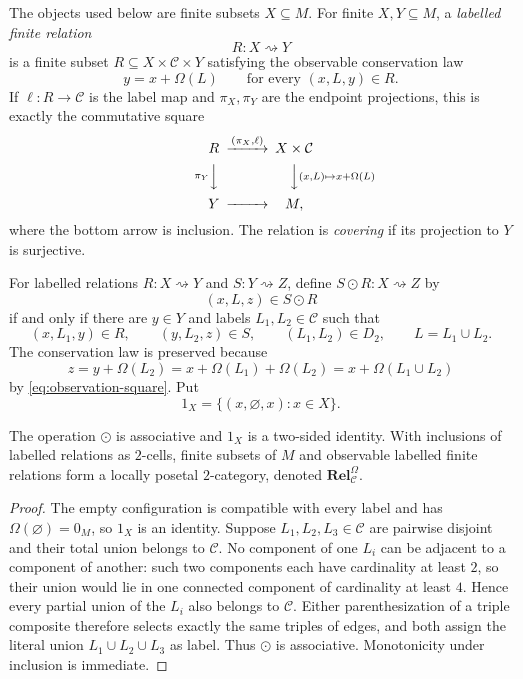 The objects used below are finite subsets $X\subseteq M$.  For finite $X,Y\subseteq M$, a \emph{labelled finite relation}
\[
R:X\rightsquigarrow Y
\]
is a finite subset $R\subseteq X\times\mathcal C\times Y$ satisfying the observable conservation law
\begin{equation}\label{eq:edge-conservation}
y=x+\Omega(L)
\qquad\text{for every }(x,L,y)\in R.
\end{equation}
If $\ell:R\to\mathcal C$ is the label map and $\pi_X,\pi_Y$ are the endpoint projections, this is exactly the commutative square
\begin{equation}\label{eq:edge-conservation-square}
\begin{CD}
R @>{(\pi_X,\ell)}>> X\times\mathcal C\\
@V{\pi_Y}VV @VV{(x,L)\mapsto x+\Omega(L)}V\\
Y @>>> M,
\end{CD}
\end{equation}
where the bottom arrow is inclusion.  The relation is \emph{covering} if its projection to $Y$ is surjective.

For labelled relations $R:X\rightsquigarrow Y$ and $S:Y\rightsquigarrow Z$, define $S\odot R:X\rightsquigarrow Z$ by
\[
(x,L,z)\in S\odot R
\]
if and only if there are $y\in Y$ and labels $L_1,L_2\in\mathcal C$ such that
\[
(x,L_1,y)\in R,
\qquad
(y,L_2,z)\in S,
\qquad
(L_1,L_2)\in D_2,
\qquad
L=L_1\cup L_2.
\]
The conservation law is preserved because
\[
z=y+\Omega(L_2)
=x+\Omega(L_1)+\Omega(L_2)
=x+\Omega(L_1\cup L_2)
\]
by \eqref{eq:observation-square}.  Put
\[
1_X=\{(x,\varnothing,x):x\in X\}.
\]

\begin{lemma}\label{lem:labelled-relation-category}
The operation $\odot$ is associative and $1_X$ is a two-sided identity.  With inclusions of labelled relations as $2$-cells, finite subsets of $M$ and observable labelled finite relations form a locally posetal $2$-category, denoted $\mathbf{Rel}_{\mathcal C}^{\Omega}$.
\end{lemma}

\begin{proof}
The empty configuration is compatible with every label and has $\Omega(\varnothing)=0_M$, so $1_X$ is an identity.  Suppose $L_1,L_2,L_3\in\mathcal C$ are pairwise disjoint and their total union belongs to $\mathcal C$.  No component of one $L_i$ can be adjacent to a component of another: such two components each have cardinality at least $2$, so their union would lie in one connected component of cardinality at least $4$.  Hence every partial union of the $L_i$ also belongs to $\mathcal C$.  Either parenthesization of a triple composite therefore selects exactly the same triples of edges, and both assign the literal union $L_1\cup L_2\cup L_3$ as label.  Thus $\odot$ is associative.  Monotonicity under inclusion is immediate.
\end{proof}

